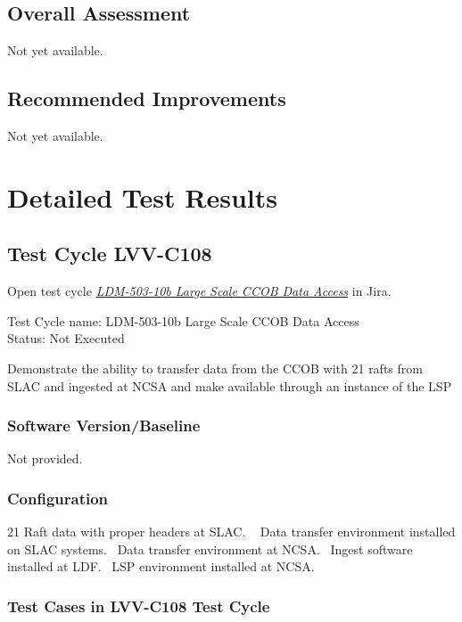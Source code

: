 \documentclass[DM,lsstdraft,STR,toc]{lsstdoc}
\begin{document}
\subsection{Overall Assessment}
\label{sect:overallassessment}

Not yet available.

\subsection{Recommended Improvements}
\label{sect:recommendations}

Not yet available.

\newpage
\section{Detailed Test Results}
\label{sect:detailedtestresults}

\subsection{Test Cycle LVV-C108 }

Open test cycle {\it \href{https://jira.lsstcorp.org/secure/Tests.jspa#/testrun/LVV-C108}{LDM-503-10b Large Scale CCOB Data Access}} in Jira.

Test Cycle name: LDM-503-10b Large Scale CCOB Data Access\\
Status: Not Executed

Demonstrate the ability to transfer data from the CCOB with 21 rafts
from SLAC and ingested at NCSA and make available through an instance of
the LSP\\[2\baselineskip]

\subsubsection{Software Version/Baseline}
Not provided.

\subsubsection{Configuration}
21 Raft data with proper headers at SLAC. ~ Data transfer environment
installed on SLAC systems. ~Data transfer environment at NCSA. ~Ingest
software installed at LDF. ~LSP environment installed at NCSA.~~

\subsubsection{Test Cases in LVV-C108 Test Cycle}
\end{document}
